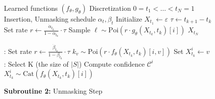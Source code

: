 \begin{figure}[!t]
\captionsetup{type=algorithm}
\centering
\begin{minipage}[t]{0.55\textwidth}
\vspace{-0.575in}
\begin{algorithm}[H]
\caption*{\textbf{Subroutine 1:} VLMDM inference}
\begin{algorithmic}[1]
\Require Learned functions $(f_\theta, g_\theta)$
\Require Discretization $0 = t_1 < \dots < t_N = 1$
\Require Insertion, Unmasking schedule $\alpha_t,\beta_t$
\State Initialize \(X_{t_1} \gets \varepsilon\)
    \State \(\tau \gets t_{k+1} - t_k\)
    \State {}
        \State Set rate $r\gets\tfrac{\dot{\alpha}_{t_k}}{1-\alpha_{t_k}}\cdot\tau$
        \State Sample $\ell\sim\mathrm{Poi}\left(r \cdot g_\theta(X_{t_k}, t_k)[i] \right)$
        \State {}
    \EndFor
\EndFor
\State \Return $X_{t_N}$
\end{algorithmic}
\end{algorithm}
\end{minipage}\hfill
\begin{minipage}[t]{0.43\textwidth}
\vspace{-0.58in}
\begin{algorithm}[H]
\caption*{\textbf{Subroutine 2: }Unmasking Step}
\begin{algorithmic}[1]
:
    \State Set rate $r\gets\frac{\dot{\beta}_{t_k}}{1-\beta_{t_k}}\cdot\tau$
    \State $k_v\sim\mathrm{Poi}(r\cdot f_\theta(X_{t_k}, t_k)[i,v])$
    \State Set $X_{t_k}^i \leftarrow v$
    \vspace{-0.02in}
    \EndIf
    \EndFor
\EndIf
{}:
\State Select $\mathrm{K}$ (the size of $|S|$)
\State Compute confidence $\mathcal{C}^i$
\vspace{-0.025in}
\EndFor
\vspace{-0.03in}
\State  $X_{t_k}^i \sim \mathrm{Cat}(f_\theta(X_{t_k},t_k)[i])$
\EndFor
\EndIf
\end{algorithmic}
\end{algorithm}
\end{minipage}

\end{figure}
